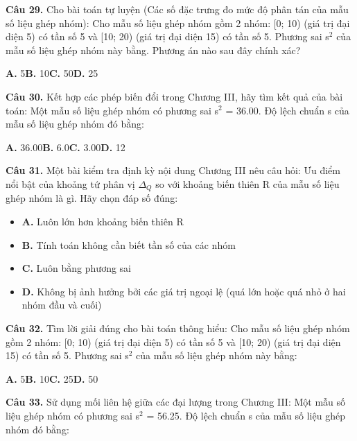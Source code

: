 \documentclass[11pt,a4paper]{article}
\begin{document}
\textbf{\color{primary} Câu 29.} Cho bài toán tự luyện (Các số đặc trưng đo mức độ phân tán của mẫu số liệu ghép nhóm): Cho mẫu số liệu ghép nhóm gồm 2 nhóm: [0; 10) (giá trị đại diện 5) có tần số 5 và [10; 20) (giá trị đại diện 15) có tần số 5. Phương sai s$^2$ của mẫu số liệu ghép nhóm này bằng. Phương án nào sau đây chính xác?\par
\hspace*{1.5em}\textbf{A.} 5\quad\quad \textbf{B.} 10\quad\quad \textbf{C.} 50\quad\quad \textbf{D.} 25\par\vspace{2pt}
\textbf{\color{primary} Câu 30.} Kết hợp các phép biến đổi trong Chương III, hãy tìm kết quả của bài toán: Một mẫu số liệu ghép nhóm có phương sai s$^2$ = 36.00. Độ lệch chuẩn s của mẫu số liệu ghép nhóm đó bằng:\par
\hspace*{1.5em}\textbf{A.} 36.00\quad\quad \textbf{B.} 6.0\quad\quad \textbf{C.} 3.00\quad\quad \textbf{D.} 12\par\vspace{2pt}
\textbf{\color{primary} Câu 31.} Một bài kiểm tra định kỳ nội dung Chương III nêu câu hỏi: Ưu điểm nổi bật của khoảng tứ phân vị $\Delta_Q$ so với khoảng biến thiên R của mẫu số liệu ghép nhóm là gì. Hãy chọn đáp số đúng:\par
\begin{itemize}\setlength{\itemsep}{1pt}\setlength{\parskip}{0pt}
  \item[] \textbf{A.} Luôn lớn hơn khoảng biến thiên R
  \item[] \textbf{B.} Tính toán không cần biết tần số của các nhóm
  \item[] \textbf{C.} Luôn bằng phương sai
  \item[] \textbf{D.} Không bị ảnh hưởng bởi các giá trị ngoại lệ (quá lớn hoặc quá nhỏ ở hai nhóm đầu và cuối)
\end{itemize}\vspace{2pt}
\textbf{\color{primary} Câu 32.} Tìm lời giải đúng cho bài toán thông hiểu: Cho mẫu số liệu ghép nhóm gồm 2 nhóm: [0; 10) (giá trị đại diện 5) có tần số 5 và [10; 20) (giá trị đại diện 15) có tần số 5. Phương sai s$^2$ của mẫu số liệu ghép nhóm này bằng:\par
\hspace*{1.5em}\textbf{A.} 5\quad\quad \textbf{B.} 10\quad\quad \textbf{C.} 25\quad\quad \textbf{D.} 50\par\vspace{2pt}
\textbf{\color{primary} Câu 33.} Sử dụng mối liên hệ giữa các đại lượng trong Chương III: Một mẫu số liệu ghép nhóm có phương sai s$^2$ = 56.25. Độ lệch chuẩn s của mẫu số liệu ghép nhóm đó bằng:\par
\end{document}
